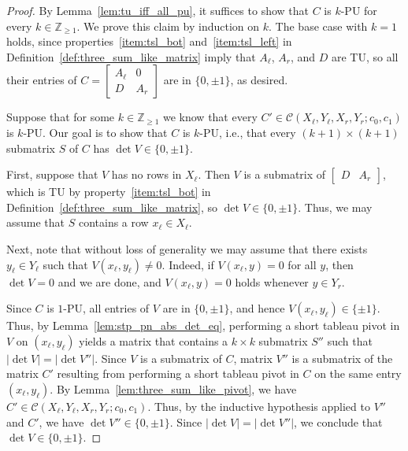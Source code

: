\begin{proof}
    By Lemma~\ref{lem:tu_iff_all_pu}, it suffices to show that $C$ is $k$-PU for every $k \in \mathbb{Z}_{\geq 1}$. We prove this claim by induction on $k$. The base case with $k = 1$ holds, since properties~\ref{item:tsl_bot} and~\ref{item:tsl_left} in Definition~\ref{def:three_sum_like_matrix} imply that $A_{\ell}$, $A_{r}$, and $D$ are TU, so all their entries of $C = \begin{bmatrix} A_{\ell} & 0 \\ D & A_{r} \end{bmatrix}$ are in $\{0, \pm 1\}$, as desired.

    Suppose that for some $k \in \mathbb{Z}_{\geq 1}$ we know that every $C' \in \mathcal{C} (X_{\ell}, Y_{\ell}, X_{r}, Y_{r}; c_{0}, c_{1})$ is $k$-PU. Our goal is to show that $C$ is $k$-PU, i.e., that every $(k + 1) \times (k + 1)$ submatrix $S$ of $C$ has $\det V \in \{0, \pm 1\}$.

    First, suppose that $V$ has no rows in $X_{\ell}$. Then $V$ is a submatrix of $\begin{bmatrix} D & A_{r} \end{bmatrix}$, which is TU by property~\ref{item:tsl_bot} in Definition~\ref{def:three_sum_like_matrix}, so $\det V \in \{0, \pm 1\}$. Thus, we may assume that $S$ contains a row $x_{\ell} \in X_{\ell}$.

    Next, note that without loss of generality we may assume that there exists $y_{\ell} \in Y_{\ell}$ such that $V (x_{\ell}, y_{\ell}) \neq 0$. Indeed, if $V (x_{\ell}, y) = 0$ for all $y$, then $\det V = 0$ and we are done, and $V (x_{\ell}, y) = 0$ holds whenever $y \in Y_{r}$.

    Since $C$ is $1$-PU, all entries of $V$ are in $\{0, \pm 1\}$, and hence $V (x_{\ell}, y_{\ell}) \in \{\pm 1\}$. Thus, by Lemma~\ref{lem:stp_pn_abs_det_eq}, performing a short tableau pivot in $V$ on $(x_{\ell}, y_{\ell})$ yields a matrix that contains a $k \times k$ submatrix $S''$ such that $|\det V| = |\det V''|$. Since $V$ is a submatrix of $C$, matrix $V''$ is a submatrix of the matrix $C'$ resulting from performing a short tableau pivot in $C$ on the same entry $(x_{\ell}, y_{\ell})$. By Lemma~\ref{lem:three_sum_like_pivot}, we have $C' \in \mathcal{C} (X_{\ell}, Y_{\ell}, X_{r}, Y_{r}; c_{0}, c_{1})$. Thus, by the inductive hypothesis applied to $V''$ and $C'$, we have $\det V'' \in \{0, \pm 1\}$. Since $|\det V| = |\det V''|$, we conclude that $\det V \in \{0, \pm 1\}$.
\end{proof}

